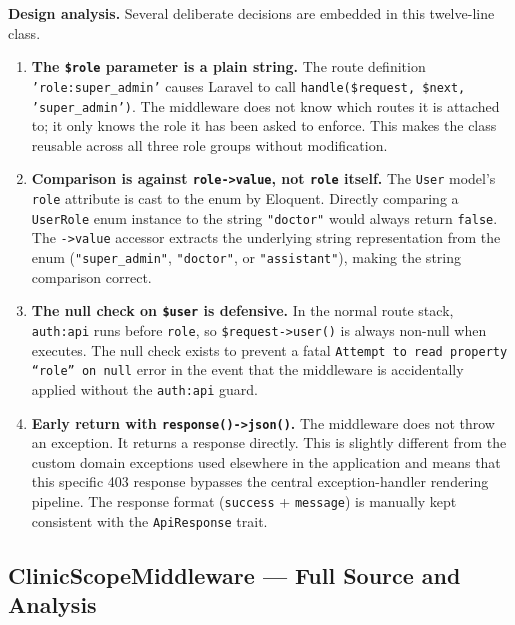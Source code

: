 \textbf{Design analysis.} Several deliberate decisions are embedded in
this twelve-line class.

\begin{enumerate}
  \item \textbf{The \texttt{\$role} parameter is a plain string.}
    The route definition \texttt{'role:super\_admin'} causes Laravel to
    call \texttt{handle(\$request, \$next, 'super\_admin')}. The
    middleware does not know which routes it is attached to; it only
    knows the role it has been asked to enforce. This makes the class
    reusable across all three role groups without modification.

  \item \textbf{Comparison is against \texttt{role->value}, not
    \texttt{role} itself.}
    The \texttt{User} model's \texttt{role} attribute is cast to the
     enum by Eloquent. Directly comparing a
    \texttt{UserRole} enum instance to the string \texttt{"doctor"}
    would always return \texttt{false}. The \texttt{->value} accessor
    extracts the underlying string representation from the enum
    (\texttt{"super\_admin"}, \texttt{"doctor"}, or
    \texttt{"assistant"}), making the string comparison correct.

  \item \textbf{The null check on \texttt{\$user} is defensive.}
    In the normal route stack, \texttt{auth:api} runs before
    \texttt{role}, so \texttt{\$request->user()} is always non-null
    when  executes. The null check exists to
    prevent a fatal \texttt{Attempt to read property ``role'' on null}
    error in the event that the middleware is accidentally applied
    without the \texttt{auth:api} guard.

  \item \textbf{Early return with \texttt{response()->json()}.}
    The middleware does not throw an exception. It returns a response
    directly. This is slightly different from the custom domain
    exceptions used elsewhere in the application and means that this
    specific 403 response bypasses the central exception-handler
    rendering pipeline. The response format (\texttt{success} +
    \texttt{message}) is manually kept consistent with the
    \texttt{ApiResponse} trait.
\end{enumerate}

\subsection{ClinicScopeMiddleware --- Full Source and Analysis}

